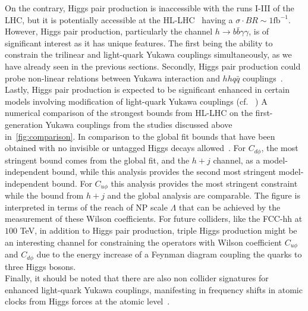 On the contrary, Higgs pair production is inaccessible with the runs I-III of the LHC, but it is potentially accessible at the HL-LHC~\cite{Binoth:2006ym} having a $ \sigma \cdot BR\sim 1\mathrm{fb}^{-1}$. However, Higgs pair production, particularly the channel $h \to b \bar b \gamma \gamma $, is of significant interest as it has unique features. The first being the ability to constrain the trilinear and light-quark Yukawa couplings simultaneously, as we have already seen in the previous sections. Secondly, Higgs pair production could probe non-linear relations between Yukawa interaction and $hh q\bar q$ couplings~\cite{Contino:2012xk}. Lastly, Higgs pair production is expected to be significant enhanced in certain models involving modification of light-quark Yukawa couplings (cf. ~\cite{Bar-Shalom:2018rjs,Bauer:2017cov,Egana-Ugrinovic:2021uew})
A numerical comparison of the strongest bounds from HL-LHC on the first-generation Yukawa couplings from the studies discussed above in~\autoref{fig:comparison}. In comparison to the global fit bounds that have been obtained with no invisible or untagged Higgs decays allowed~\cite{deBlas:2019rxi}. For $C_{d\phi}$, the most stringent bound comes from the global fit, and the $h+j$ channel, as a model-independent bound, while this analysis provides the second most stringent model-independent bound. For $C_{u\phi}$ this analysis provides the most stringent constraint while the bound from $h+j$ and the global analysis are comparable. The figure is interpreted in terms of the reach of NP scale $\Lambda$ that can be achieved by the measurement of these Wilson coefficients. For future colliders, like the FCC-hh at $100$ TeV, in addition to Higgs pair production, triple Higgs production might be an interesting channel for constraining the operators with Wilson coefficient $C_{u\phi}$ and $C_{d\phi}$ due to the energy increase of a Feynman diagram coupling the quarks to three Higgs bosons.\\
Finally, it should be noted that there are also non collider signatures for enhanced light-quark Yukawa couplings, manifesting in frequency shifts in atomic clocks from Higgs forces at the atomic level~\cite{Delaunay:2016brc}. 
